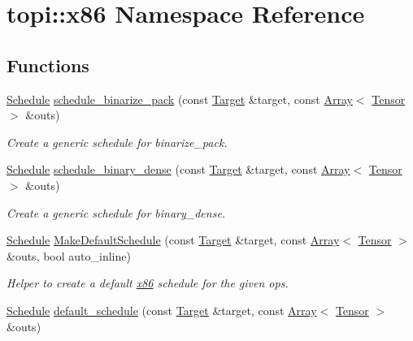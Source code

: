 \hypertarget{namespacetopi_1_1x86}{}\section{topi\+:\+:x86 Namespace Reference}
\label{namespacetopi_1_1x86}
\subsection*{Functions}
\begin{DoxyCompactItemize}
\item 
\hyperlink{classtvm_1_1te_1_1Schedule}{Schedule} \hyperlink{namespacetopi_1_1x86_ae4ec847b1ba76f9f16db977fd974f54b}{schedule\+\_\+binarize\+\_\+pack} (const \hyperlink{classtvm_1_1Target}{Target} \&target, const \hyperlink{classtvm_1_1Array}{Array}$<$ \hyperlink{classtvm_1_1te_1_1Tensor}{Tensor} $>$ \&outs)
\begin{DoxyCompactList}\small\item\em Create a generic schedule for binarize\+\_\+pack. \end{DoxyCompactList}\item 
\hyperlink{classtvm_1_1te_1_1Schedule}{Schedule} \hyperlink{namespacetopi_1_1x86_afc0ee3b6ec048b80ed7dad2ac75a72e3}{schedule\+\_\+binary\+\_\+dense} (const \hyperlink{classtvm_1_1Target}{Target} \&target, const \hyperlink{classtvm_1_1Array}{Array}$<$ \hyperlink{classtvm_1_1te_1_1Tensor}{Tensor} $>$ \&outs)
\begin{DoxyCompactList}\small\item\em Create a generic schedule for binary\+\_\+dense. \end{DoxyCompactList}\item 
\hyperlink{classtvm_1_1te_1_1Schedule}{Schedule} \hyperlink{namespacetopi_1_1x86_a88069d3c8699c44463c94f436d7eb903}{Make\+Default\+Schedule} (const \hyperlink{classtvm_1_1Target}{Target} \&target, const \hyperlink{classtvm_1_1Array}{Array}$<$ \hyperlink{classtvm_1_1te_1_1Tensor}{Tensor} $>$ \&outs, bool auto\+\_\+inline)
\begin{DoxyCompactList}\small\item\em Helper to create a default \hyperlink{namespacetopi_1_1x86}{x86} schedule for the given ops. \end{DoxyCompactList}\item 
\hyperlink{classtvm_1_1te_1_1Schedule}{Schedule} \hyperlink{namespacetopi_1_1x86_a3a708f59316d41d321b8076ad6ad8b29}{default\+\_\+schedule} (const \hyperlink{classtvm_1_1Target}{Target} \&target, const \hyperlink{classtvm_1_1Array}{Array}$<$ \hyperlink{classtvm_1_1te_1_1Tensor}{Tensor} $>$ \&outs)

\end{DoxyCompactItemize}
